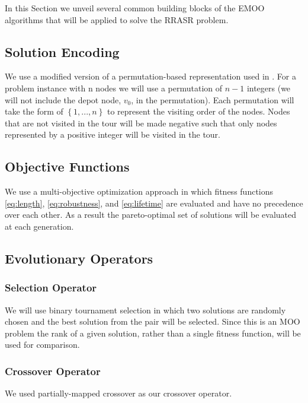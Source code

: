 \documentclass[conference]{IEEEtran}
\begin{document}
In this Section we unveil several common building blocks of the EMOO algorithms that will be applied to solve the RRASR problem.

\subsection{Solution Encoding}
\label{sec:Algorithms:Encoding}

We use a modified version of a permutation-based representation used in \cite{liao2010evolutionary}. For a problem instance with n nodes we will use a permutation of $n-1$ integers (we will not include the depot node, $v_0$, in the permutation). Each permutation will take the form of $\left\{ 1,...,n \right\}$ to represent the visiting order of the nodes. Nodes that are not visited in the tour will be made negative such that only nodes represented by a positive integer will be visited in the tour.

\subsection{Objective Functions}
\label{sec:Algorithms:ObjFunctions}

We use a multi-objective optimization approach in which fitness functions \eqref{eq:length}, \eqref{eq:robustness}, and \eqref{eq:lifetime} are evaluated and have no precedence over each other. As a result the pareto-optimal set of solutions will be evaluated at each generation.

\subsection{Evolutionary Operators}
\label{sec:Algorithms:Operators}

\subsubsection{Selection Operator}
\label{sec:Algorithms:Operators:Selection}
We will use binary tournament selection in which two solutions are randomly chosen and the best solution from the pair will be selected. Since this is an MOO problem the rank of a given solution, rather than a single fitness function, will be used for comparison.

\subsubsection{Crossover Operator}
\label{sec:Algorithms:Operators:Crossover}
We used partially-mapped crossover \cite{goldberg1985alleles} as our crossover operator.
\end{document}
